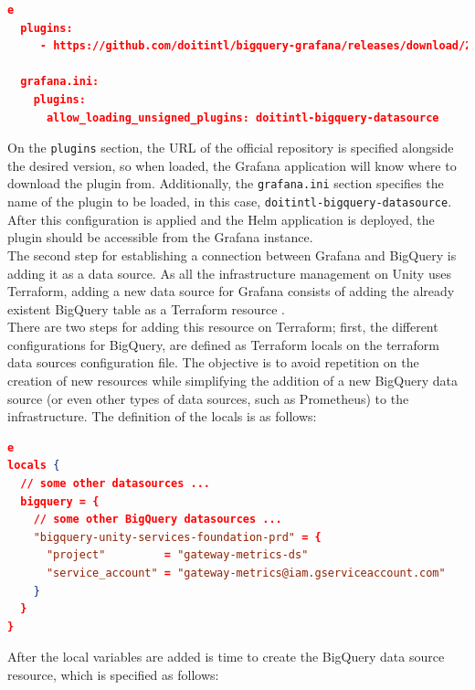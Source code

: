 \documentclass[english, 12pt, a4paper, sci, utf8, a-1b, online]{aaltothesis}
\begin{document}
\begin{lstlisting}[language=json,firstnumber=1]e
  plugins:
     - https://github.com/doitintl/bigquery-grafana/releases/download/2.0.3/doitintl-bigquery-datasource-2.0.3.zip;doit-bigquery-datasource

  grafana.ini:
    plugins:
      allow_loading_unsigned_plugins: doitintl-bigquery-datasource
\end{lstlisting}

On the \texttt{plugins} section, the URL of the official repository is specified alongside the desired version, so when loaded, the Grafana application will know where to download the plugin from. Additionally, the \texttt{grafana.ini} section specifies the name of the plugin to be loaded, in this case, \texttt{doitintl-bigquery-datasource}. After this configuration is applied and the Helm application is deployed, the plugin should be accessible from the Grafana instance. \\

The second step for establishing a connection between Grafana and BigQuery is adding it as a data source. As all the infrastructure management on Unity uses Terraform, adding a new data source for Grafana consists of adding the already existent BigQuery table as a Terraform resource \cite{TerraformResource}.\\

There are two steps for adding this resource on Terraform; first, the different configurations for BigQuery, are defined as Terraform locals on the terraform data sources configuration file. The objective is to avoid repetition on the creation of new resources while simplifying the addition of a new BigQuery data source (or even other types of data sources, such as Prometheus) to the infrastructure. The definition of the locals is as follows:\\

\begin{lstlisting}[language=json,firstnumber=1]e
locals {
  // some other datasources ...
  bigquery = {
    // some other BigQuery datasources ...
    "bigquery-unity-services-foundation-prd" = {
      "project"         = "gateway-metrics-ds"
      "service_account" = "gateway-metrics@iam.gserviceaccount.com"
    }
  }
}
\end{lstlisting}

After the local variables are added is time to create the BigQuery data source resource, which is specified as follows:\\
\end{document}
